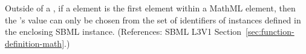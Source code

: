 Outside of a \FunctionDefinition, if a  element is the first
element within a MathML  element, then the 's
value can only be chosen from the set of identifiers of
\FunctionDefinition{} instances defined in the enclosing SBML \Model
instance.  (References: SBML L3V1
Section~\ref{sec:function-definition-math}.)
